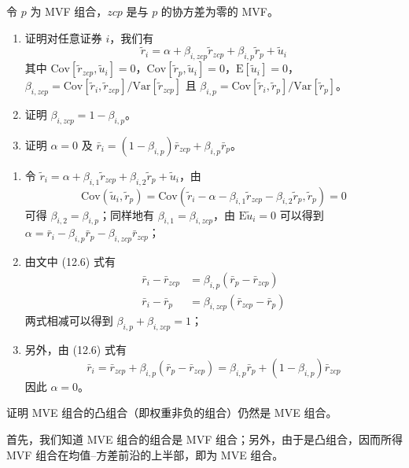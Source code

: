 \begin{problem}
 令 $p$ 为 MVF 组合，$zcp$ 是与 $p$ 的协方差为零的 MVF。
\begin{enumerate}[label=(\alph*)]
    \item 证明对任意证券 $i$，我们有
    \[
        \tilde{r}_{i}=\alpha+\beta_{i,zcp}\tilde{r}_{zcp}+\beta_{i,p}\tilde{r}_{p}+\tilde{u}_{i}
    \]
    其中 $\mathrm{Cov}[\tilde{r}_{zcp},\tilde{u}_{i}]=0$，$\mathrm{Cov}[\tilde{r}_{p},\tilde{u}_{i}]=0$，$\mathrm{E}[\tilde{u}_{i}]=0$，$\beta_{i,zcp}=\mathrm{Cov}[\tilde{r}_{i},\tilde{r}_{zcp}]/\mathrm{Var}[\tilde{r}_{zcp}]$ 且 $\beta_{i,p}=\mathrm{Cov}[\tilde{r}_{i},\tilde{r}_{p}]/\mathrm{Var}[\tilde{r}_{p}]$。
    \item 证明 $\beta_{i,zcp}=1-\beta_{i,p}$。
    \item 证明 $\alpha=0$ 及 $\bar{r}_{i}=(1-\beta_{i,p})\bar{r}_{zcp}+\beta_{i,p}\bar{r}_{p}$。
\end{enumerate}
\end{problem}
\begin{solution}
\begin{enumerate}[label=(\alph*)]
    \item 令 $\tilde{r}_{i}=\alpha+\beta_{i,1}\tilde{r}_{zcp}+\beta_{i,2}\tilde{r}_{p}+\tilde{u}_{i}$，由
    \[
        \mathrm{Cov}(\tilde{u}_{i},\tilde{r}_{p})=\mathrm{Cov}(\tilde{r}_{i}-\alpha-\beta_{i,1}\tilde{r}_{zcp}-\beta_{i,2}\tilde{r}_{p},\tilde{r}_{p})=0
    \]
    可得 $\beta_{i,2}=\beta_{i,p}$；同样地有 $\beta_{i,1}=\beta_{i,zcp}$，由 $\mathrm{E}\tilde{u}_{i}=0$ 可以得到 $\alpha=\bar{r}_{i}-\beta_{i,p}\bar{r}_{p}-\beta_{i,zcp}\bar{r}_{zcp}$；
    \item 由文中 (12.6) 式有
    \[
        \begin{aligned}
            \bar{r}_{i}-\bar{r}_{zcp}&=\beta_{i,p}(\bar{r}_{p}-\bar{r}_{zcp})\\
            \bar{r}_{i}-\bar{r}_{p}&=\beta_{i,zcp}(\bar{r}_{zcp}-\bar{r}_{p})
        \end{aligned}
    \]
    两式相减可以得到 $\beta_{i,p}+\beta_{i,zcp}=1$；
    \item 另外，由 (12.6) 式有
    \[
        \bar{r}_{i}=\bar{r}_{zcp}+\beta_{i,p}(\bar{r}_{p}-\bar{r}_{zcp})=\beta_{i,p}\bar{r}_{p}+(1-\beta_{i,p})\bar{r}_{zcp}
    \]
    因此 $\alpha=0$。
\end{enumerate}
\end{solution}

\begin{problem}
 证明 MVE 组合的凸组合（即权重非负的组合）仍然是 MVE 组合。
\end{problem}
\begin{solution}
首先，我们知道 MVE 组合的组合是 MVF 组合；另外，由于是凸组合，因而所得 MVF 组合在均值--方差前沿的上半部，即为 MVE 组合。
\end{solution}


